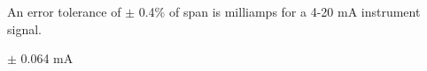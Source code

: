 

An error tolerance of $\pm$ 0.4\% of span is \underbar{\hskip 50pt} milliamps for a 4-20 mA instrument signal.

\vskip 10pt







$\pm$ 0.064 mA
 










